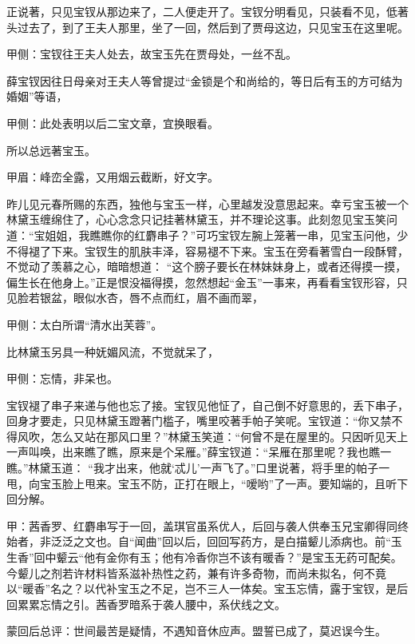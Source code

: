 \begin{parag}
    正说著，只见宝钗从那边来了，二人便走开了。宝钗分明看见，只装看不见，低著头过去了，到了王夫人那里，坐了一回，然后到了贾母这边，只见宝玉在这里呢。\begin{note}甲侧：宝钗往王夫人处去，故宝玉先在贾母处，一丝不乱。\end{note}薛宝钗因往日母亲对王夫人等曾提过“金锁是个和尚给的，等日后有玉的方可结为婚姻”等语，\begin{note}甲侧：此处表明以后二宝文章，宜换眼看。\end{note}所以总远著宝玉。\begin{note}甲眉：峰峦全露，又用烟云截断，好文字。\end{note}昨儿见元春所赐的东西，独他与宝玉一样，心里越发没意思起来。幸亏宝玉被一个林黛玉缠绵住了，心心念念只记挂著林黛玉，并不理论这事。此刻忽见宝玉笑问道：“宝姐姐，我瞧瞧你的红麝串子？”可巧宝钗左腕上笼著一串，见宝玉问他，少不得褪了下来。宝钗生的肌肤丰泽，容易褪不下来。宝玉在旁看著雪白一段酥臂，不觉动了羡慕之心，暗暗想道： “这个膀子要长在林妹妹身上，或者还得摸一摸，偏生长在他身上。”正是恨没福得摸，忽然想起“金玉”一事来，再看看宝钗形容，只见脸若银盆，眼似水杏，唇不点而红，眉不画而翠，\begin{note}甲侧：太白所谓“清水出芙蓉”。\end{note}比林黛玉另具一种妩媚风流，不觉就呆了，\begin{note}甲侧：忘情，非呆也。\end{note}宝钗褪了串子来递与他也忘了接。宝钗见他怔了，自己倒不好意思的，丢下串子，回身才要走，只见林黛玉蹬著门槛子，嘴里咬著手帕子笑呢。宝钗道：“你又禁不得风吹，怎么又站在那风口里？”林黛玉笑道：“何曾不是在屋里的。只因听见天上一声叫唤，出来瞧了瞧，原来是个呆雁。”薛宝钗道：“呆雁在那里呢？我也瞧一瞧。”林黛玉道： “我才出来，他就‘忒儿’一声飞了。”口里说著，将手里的帕子一甩，向宝玉脸上甩来。宝玉不防，正打在眼上，“嗳哟”了一声。要知端的，且听下回分解。
\end{parag}


\begin{parag}
    \begin{note}甲：茜香罗、红麝串写于一回，盖琪官虽系优人，后回与袭人供奉玉兄宝卿得同终始者，非泛泛之文也。自“闻曲”回以后，回回写药方，是白描颦儿添病也。前“玉生香”回中颦云“他有金你有玉；他有冷香你岂不该有暖香？”是宝玉无药可配矣。今颦儿之剂若许材料皆系滋补热性之药，兼有许多奇物，而尚未拟名，何不竟以“暖香”名之？以代补宝玉之不足，岂不三人一体矣。宝玉忘情，露于宝钗，是后回累累忘情之引。茜香罗暗系于袭人腰中，系伏线之文。\end{note}
\end{parag}


\begin{parag}
    \begin{note}蒙回后总评：世间最苦是疑情，不遇知音休应声。盟誓已成了，莫迟误今生。\end{note}
\end{parag}
